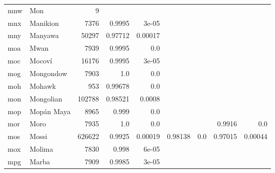 \documentclass[11pt]{article}
\begin{document}
\begin{table*}[h]
{\begin{tabular}{llrrrrrrr}
mnw         & Mon         & 9         &          &          &          &          &          &          \\

mnx         & Manikion         & 7376         & 0.9995         & 3e-05         &          &          &          &          \\

mny         & Manyawa         & 50297         & 0.97712         & 0.00017         &          &          &          &          \\

moa         & Mwan         & 7939         & 0.9995         & 0.0         &          &          &          &          \\

moc         & Mocoví         & 16176         & 0.9995         & 3e-05         &          &          &          &          \\

mog         & Mongondow         & 7903         & 1.0         & 0.0         &          &          &          &          \\

moh         & Mohawk         & 953         & 0.99678         & 0.0         &          &          &          &          \\

mon         & Mongolian         & 102788         & 0.98521         & 0.0008         &          &          &          &          \\

mop         & Mopán Maya         & 8965         & 0.999         & 0.0         &          &          &          &          \\

mor         & Moro         & 7935         & 1.0         & 0.0         &          &          & 0.9916         & 0.0         \\

mos         & Mossi         & 626622         & 0.9925         & 0.00019         & 0.98138         & 0.0         & 0.97015         & 0.00044         \\

mox         & Molima         & 7830         & 0.998         & 6e-05         &          &          &          &          \\

mpg         & Marba         & 7909         & 0.9985         & 3e-05         &          &          &          &          \\


\end{tabular}}
\end{table*}
\end{document}
